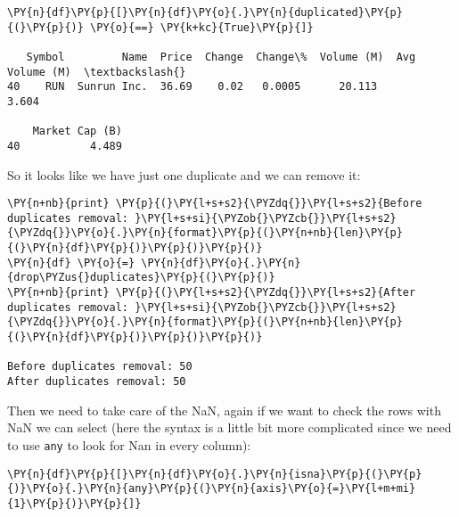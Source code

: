 \begin{Answer}
\begin{tcolorbox}[size=fbox, boxrule=1pt, colback=cellbackground, colframe=cellborder]
\begin{Verbatim}[commandchars=\\\{\}]
\PY{n}{df}\PY{p}{[}\PY{n}{df}\PY{o}{.}\PY{n}{duplicated}\PY{p}{(}\PY{p}{)} \PY{o}{==} \PY{k+kc}{True}\PY{p}{]}

   Symbol         Name  Price  Change  Change\%  Volume (M)  Avg Volume (M)  \textbackslash{}
40    RUN  Sunrun Inc.  36.69    0.02   0.0005      20.113           3.604

    Market Cap (B)
40           4.489
\end{Verbatim}
\end{tcolorbox}
        
So it looks like we have just one duplicate and we can remove it:

\begin{tcolorbox}[size=fbox, boxrule=1pt, colback=cellbackground, colframe=cellborder]
\begin{Verbatim}[commandchars=\\\{\}]
\PY{n+nb}{print} \PY{p}{(}\PY{l+s+s2}{\PYZdq{}}\PY{l+s+s2}{Before duplicates removal: }\PY{l+s+si}{\PYZob{}\PYZcb{}}\PY{l+s+s2}{\PYZdq{}}\PY{o}{.}\PY{n}{format}\PY{p}{(}\PY{n+nb}{len}\PY{p}{(}\PY{n}{df}\PY{p}{)}\PY{p}{)}\PY{p}{)}
\PY{n}{df} \PY{o}{=} \PY{n}{df}\PY{o}{.}\PY{n}{drop\PYZus{}duplicates}\PY{p}{(}\PY{p}{)}
\PY{n+nb}{print} \PY{p}{(}\PY{l+s+s2}{\PYZdq{}}\PY{l+s+s2}{After duplicates removal: }\PY{l+s+si}{\PYZob{}\PYZcb{}}\PY{l+s+s2}{\PYZdq{}}\PY{o}{.}\PY{n}{format}\PY{p}{(}\PY{n+nb}{len}\PY{p}{(}\PY{n}{df}\PY{p}{)}\PY{p}{)}\PY{p}{)}

Before duplicates removal: 50
After duplicates removal: 50
\end{Verbatim}
\end{tcolorbox}

Then we need to take care of the NaN, again if we want to check the rows with NaN we can select (here the syntax is a little bit more complicated since we need to use \texttt{any} to look for Nan in every column):

\begin{tcolorbox}[size=fbox, boxrule=1pt, colback=cellbackground, colframe=cellborder]
\begin{Verbatim}[commandchars=\\\{\}]
\PY{n}{df}\PY{p}{[}\PY{n}{df}\PY{o}{.}\PY{n}{isna}\PY{p}{(}\PY{p}{)}\PY{o}{.}\PY{n}{any}\PY{p}{(}\PY{n}{axis}\PY{o}{=}\PY{l+m+mi}{1}\PY{p}{)}\PY{p}{]}


\end{Verbatim}
\end{tcolorbox}
\end{Answer}
